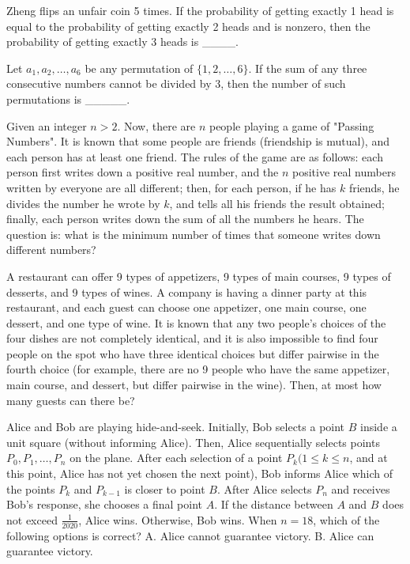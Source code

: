 \begin{problem}\label{Combinary-16}
Zheng flips an unfair coin 5 times. If the probability of getting exactly 1 head is equal to the probability of getting exactly 2 heads and is nonzero, then the probability of getting exactly 3 heads is \_\_\_\_.
\end{problem}


\begin{problem}\label{Combinary-17}
 Let $a_{1}, a_{2}, \ldots, a_{6}$ be any permutation of $\{1,2, \ldots, 6\}$. If the sum of any three consecutive numbers cannot be divided by 3, then the number of such permutations is \_\_\_\_\_.
\end{problem}

\begin{problem}\label{Combinary-18}
Given an integer $n > 2$. Now, there are $n$ people playing a game of "Passing Numbers". It is known that some people are friends (friendship is mutual), and each person has at least one friend. The rules of the game are as follows: each person first writes down a positive real number, and the $n$ positive real numbers written by everyone are all different; then, for each person, if he has $k$ friends, he divides the number he wrote by $k$, and tells all his friends the result obtained; finally, each person writes down the sum of all the numbers he hears. The question is: what is the minimum number of times that someone writes down different numbers? 
\end{problem}

\begin{problem}\label{Combinary-19}
A restaurant can offer 9 types of appetizers, 9 types of main courses, 9 types of desserts, and 9 types of wines. A company is having a dinner party at this restaurant, and each guest can choose one appetizer, one main course, one dessert, and one type of wine. It is known that any two people's choices of the four dishes are not completely identical, and it is also impossible to find four people on the spot who have three identical choices but differ pairwise in the fourth choice (for example, there are no 9 people who have the same appetizer, main course, and dessert, but differ pairwise in the wine). Then, at most how many guests can there be?
\end{problem}


\begin{problem}\label{Combinary-20}
Alice and Bob are playing hide-and-seek. Initially, Bob selects a point $B$ inside a unit square (without informing Alice). Then, Alice sequentially selects points $P_0, P_1, \ldots, P_n$ on the plane. After each selection of a point $P_k (1 \leq k \leq n$, and at this point, Alice has not yet chosen the next point), Bob informs Alice which of the points $P_k$ and $P_{k-1}$ is closer to point $B$. After Alice selects $P_n$ and receives Bob's response, she chooses a final point $A$. If the distance between $A$ and $B$ does not exceed $\frac{1}{2020}$, Alice wins. Otherwise, Bob wins. When $n=18$, which of the following options is correct?
A. Alice cannot guarantee victory.
B. Alice can guarantee victory. 
\end{problem}

